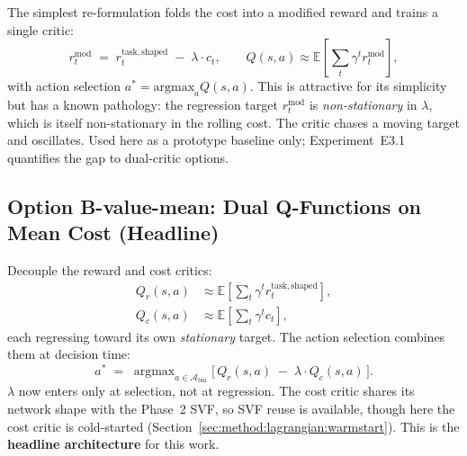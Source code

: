 \documentclass[11pt,a4paper]{report}
\begin{document}
The simplest re-formulation folds the cost into a modified reward
and trains a single critic:
\begin{equation}
  r^{\mathrm{mod}}_t \;=\; r^{\mathrm{task,shaped}}_t \;-\; \lambda \cdot c_t,
  \qquad
  Q(s,a) \approx \mathbb{E}\!\left[\sum_t \gamma^t r^{\mathrm{mod}}_t\right],
  \label{eq:option-A}
\end{equation}
with action selection $a^* = \mathrm{argmax}_a Q(s,a)$. This is
attractive for its simplicity but has a known pathology: the
regression target $r^{\mathrm{mod}}_t$ is \emph{non-stationary} in
$\lambda$, which is itself non-stationary in the rolling cost. The
critic chases a moving target and oscillates. Used here as a
prototype baseline only; Experiment~E3.1 quantifies the gap to
dual-critic options.

\subsection{Option B-value-mean: Dual Q-Functions on Mean Cost (Headline)}
\label{sec:method:lagrangian:Bmean}

Decouple the reward and cost critics:
\begin{align}
  Q_r(s,a) &\approx \mathbb{E}\!\left[\sum_t \gamma^t r^{\mathrm{task,shaped}}_t\right], \\
  Q_c(s,a) &\approx \mathbb{E}\!\left[\sum_t \gamma^t c_t\right],
\end{align}
each regressing toward its own \emph{stationary} target. The action
selection combines them at decision time:
\begin{equation}
  a^* \;=\; \mathop{\mathrm{argmax}}_{a \in \mathcal{A}_{\mathrm{bin}}}
  \Big[\,Q_r(s,a) \;-\; \lambda \cdot Q_c(s,a)\,\Big].
  \label{eq:Bmean-select}
\end{equation}
$\lambda$ now enters only at selection, not at regression. The
cost critic shares its network shape with the Phase~2 SVF, so SVF
reuse is available, though here the cost critic is cold-started
(Section~\ref{sec:method:lagrangian:warmstart}). This is the
\textbf{headline architecture} for this work.
\end{document}
